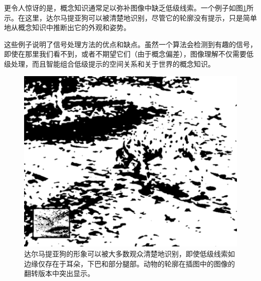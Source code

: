 

更令人惊讶的是，概念知识通常足以弥补图像中缺乏低级线索。一个例子如图\ref{fig:dalmatian}所示。在这里，达尔马提亚狗可以被清楚地识别，尽管它的轮廓没有提示，只是简单地从概念知识中推断出它的外观和姿势。

这些例子说明了信号处理方法的优点和缺点。虽然一个算法会检测到有趣的信号，即使在那里我们看不到，或者不期望它们（由于概念偏差），图像理解不仅需要低级处理，而且智能组合低级提示的空间关系和关于世界的概念知识。

\begin{figure}
	\centering
		\includegraphics[width=\textwidth]{figs/dalmatian}
	\caption{达尔马提亚狗的形象可以被大多数观众清楚地识别，即使低级线索如边缘仅存在于耳朵，下巴和部分腿部。动物的轮廓在插图中的图像的翻转版本中突出显示。
	\label{fig:dalmatian}}
\end{figure}

